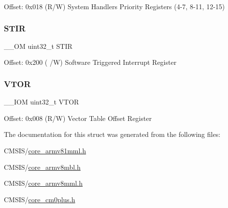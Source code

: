Offset\+: 0x018 (R/W) System Handlers Priority Registers (4-\/7, 8-\/11, 12-\/15) \mbox{\label{struct_s_c_b___type_ada9cbba14ab1cc3fddd585f870932db8}} 
\subsubsection{\texorpdfstring{STIR}{STIR}}
{\footnotesize\ttfamily \+\_\+\+\_\+\+OM uint32\+\_\+t S\+T\+IR}

Offset\+: 0x200 ( /W) Software Triggered Interrupt Register \mbox{\label{struct_s_c_b___type_ae457d2615e203c3d5904a43a1bc9df71}} 
\subsubsection{\texorpdfstring{VTOR}{VTOR}}
{\footnotesize\ttfamily \+\_\+\+\_\+\+I\+OM uint32\+\_\+t V\+T\+OR}

Offset\+: 0x008 (R/W) Vector Table Offset Register 

The documentation for this struct was generated from the following files\+:\begin{DoxyCompactItemize}
\item 
C\+M\+S\+I\+S/\mbox{\hyperlink{core__armv81mml_8h}{core\+\_\+armv81mml.\+h}}\item 
C\+M\+S\+I\+S/\mbox{\hyperlink{core__armv8mbl_8h}{core\+\_\+armv8mbl.\+h}}\item 
C\+M\+S\+I\+S/\mbox{\hyperlink{core__armv8mml_8h}{core\+\_\+armv8mml.\+h}}\item 
C\+M\+S\+I\+S/\mbox{\hyperlink{core__cm0plus_8h}{core\+\_\+cm0plus.\+h}}\end{DoxyCompactItemize}
